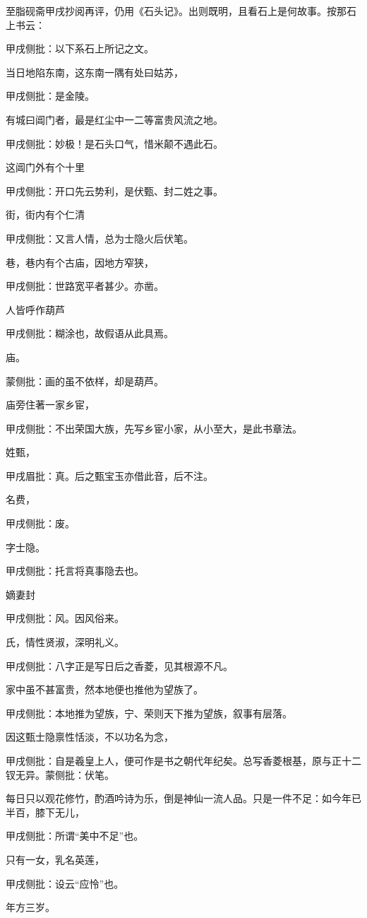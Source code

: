 \begin{parag}
    至脂砚斋甲戌抄阅再评，仍用《石头记》。出则既明，且看石上是何故事。按那石上书云：\begin{note}甲戌侧批：以下系石上所记之文。\end{note}
\end{parag}


\begin{parag}
    当日地陷东南，这东南一隅有处曰姑苏，\begin{note}甲戌侧批：是金陵。\end{note}有城曰阊门者，最是红尘中一二等富贵风流之地。\begin{note}甲戌侧批：妙极！是石头口气，惜米颠不遇此石。\end{note}这阊门外有个十里\begin{note}甲戌侧批：开口先云势利，是伏甄、封二姓之事。\end{note}街，街内有个仁清\begin{note}甲戌侧批：又言人情，总为士隐火后伏笔。\end{note}巷，巷内有个古庙，因地方窄狭，\begin{note}甲戌侧批：世路宽平者甚少。亦凿。\end{note}人皆呼作葫芦\begin{note}甲戌侧批：糊涂也，故假语从此具焉。\end{note}庙。\begin{note}蒙侧批：画的虽不依样，却是葫芦。\end{note}庙旁住著一家乡宦，\begin{note}甲戌侧批：不出荣国大族，先写乡宦小家，从小至大，是此书章法。\end{note}姓甄，\begin{note}甲戌眉批：真。后之甄宝玉亦借此音，后不注。\end{note}名费，\begin{note}甲戌侧批：废。\end{note}字士隐。\begin{note}甲戌侧批：托言将真事隐去也。\end{note}嫡妻封\begin{note}甲戌侧批：风。因风俗来。\end{note}氏，情性贤淑，深明礼义。\begin{note}甲戌侧批：八字正是写日后之香菱，见其根源不凡。\end{note}家中虽不甚富贵，然本地便也推他为望族了。\begin{note}甲戌侧批：本地推为望族，宁、荣则天下推为望族，叙事有层落。\end{note}因这甄士隐禀性恬淡，不以功名为念，\begin{note}甲戌侧批：自是羲皇上人，便可作是书之朝代年纪矣。总写香菱根基，原与正十二钗无异。蒙侧批：伏笔。\end{note}每日只以观花修竹，酌酒吟诗为乐，倒是神仙一流人品。只是一件不足：如今年已半百，膝下无儿，\begin{note}甲戌侧批：所谓“美中不足”也。\end{note}只有一女，乳名英莲，\begin{note}甲戌侧批：设云“应怜”也。\end{note}年方三岁。
\end{parag}


